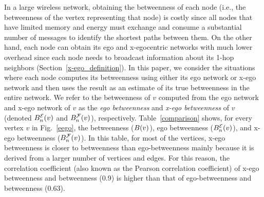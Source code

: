In a large wireless network, obtaining the betweenness of each node (i.e., the betweenness of the vertex representing that node) is costly since  all nodes that have limited memory and energy must exchange and consume a substantial number of messages to identify the shortest paths between them.
On the other hand, each node can obtain its ego and x-egocentric networks with much lower overhead since each node  needs to broadcast information about its 1-hop neighbors (Section~\ref{x-ego_definition}). 
In this paper, we consider the situations where each node computes its betweenness using either its ego network or x-ego network and then uses the result as an estimate of its true betweenness in the entire network.
We refer to the betweenness of $v$ computed from the ego network and x-ego network of $v$ as the {\em ego betweenness} and {\em x-ego betweenness} of $v$ (denoted $B_{{n}}^{\mathcal{E}}({v})$ and $B_{{n}}^{\mathcal{F}}({v})$), respectively.
Table~\ref{comparison} shows, for every vertex $v$ in Fig.~\ref{eego}, the betweenness ($B({v})$), ego betweenness ($B_{{n}}^{\mathcal{E}}({v})$), and x-ego betweenness ($B_{{n}}^{\mathcal{F}}({v})$).
In this table, for most of the vertices, x-ego betweenness is closer to betweenness than ego-betweenness mainly because it is derived from a larger number of vertices and edges.
For this reason, the correlation coefficient (also known as the Pearson correlation coefficient) of x-ego betweenness and betweenness (0.9) is higher than that of ego-betweenness and betweenness (0.63).
